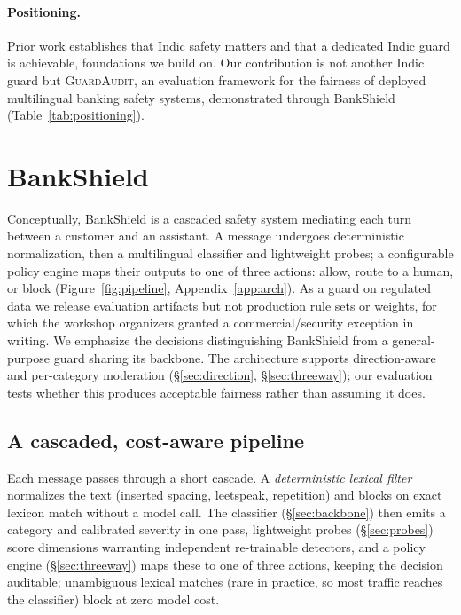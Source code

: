 \documentclass[11pt]{article}
\newcommand{\guardaudit}{\textsc{GuardAudit}}
\begin{document}
\paragraph{Positioning.} Prior work establishes that Indic safety matters and that a dedicated Indic guard is achievable, foundations we build on. Our contribution is not another Indic guard but \guardaudit{}, an evaluation framework for the fairness of deployed multilingual banking safety systems, demonstrated through BankShield (Table~\ref{tab:positioning}).



\section{BankShield}
\label{sec:system}

Conceptually, BankShield is a cascaded safety system mediating each turn between a customer and an assistant. A message undergoes deterministic normalization, then a multilingual classifier and lightweight probes; a configurable policy engine maps their outputs to one of three actions: allow, route to a human, or block (Figure~\ref{fig:pipeline}, Appendix~\ref{app:arch}). As a guard on regulated data we release evaluation artifacts but not production rule sets or weights, for which the workshop organizers granted a commercial/security exception in writing. We emphasize the decisions distinguishing BankShield from a general-purpose guard sharing its backbone. The architecture supports direction-aware and per-category moderation (\S\ref{sec:direction}, \S\ref{sec:threeway}); our evaluation tests whether this produces acceptable fairness rather than assuming it does.



\subsection{A cascaded, cost-aware pipeline}
\label{sec:cascade}

Each message passes through a short cascade. A \emph{deterministic lexical filter} normalizes the text (inserted spacing, leetspeak, repetition) and blocks on exact lexicon match without a model call. The classifier (\S\ref{sec:backbone}) then emits a category and calibrated severity in one pass, lightweight probes (\S\ref{sec:probes}) score dimensions warranting independent re-trainable detectors, and a policy engine (\S\ref{sec:threeway}) maps these to one of three actions, keeping the decision auditable; unambiguous lexical matches (rare in practice, so most traffic reaches the classifier) block at zero model cost.
\end{document}
